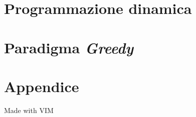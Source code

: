 \documentclass[a4paper,oneside]{book}
\theoremstyle{definition}
\theoremstyle{theorem}
\theoremstyle{theorem}
\begin{document}
\chapter{Programmazione dinamica}


\chapter{Paradigma \emph{Greedy}}


\cleardoublepage


\cleardoublepage

\appendix

\chapter{Appendice}


\clearpage
\thispagestyle{empty}
\begin{center}

    \vspace*{8cm}
    Made with VIM
\end{center}
\end{document}
